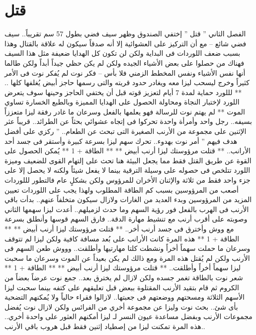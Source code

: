 \chapter{قتل}



الفصل الثاني
” قتل ”
إختفي الصندوق وظهر سيف فضي بطول 57 سم تقريباً..
سيف فضي
شائع
– مع أن التركيز على العشوائية إلا أنه صدقاً سيكون له علاقة بالقتال وهذا بسبب ضعف اللوردات فى البداية ولكن لن تكون كل الهدايا ضعيفة مثل هذا السيف فهناك من حصلوا على بعض الأشياء الجيده ولكن لم يكن حظي جيداً أبداً ولكن طالما أنها نفس الأشياء ونفس المخطط الزمني فلا بأس – فكر نوت
لم يُفكر نوت فى الأمر كثيراً وخرج ليسحب ليزا معه ويغادر حدود قريته والتى رسمها حاجز أبيض يُغلفها كلها ..
** لللورد حماية لمدة 7 أيام لتعزيز قوته قبل أن يختفي الحاجز وحينها سوف يتعرض اللورد لإختبار النجاة ومحاولة الحصول على الهدايا المميزة وبالطبع الخسارة تساوي الموت **
لم يهتم نوت للرسالة فهو يعلمها بالفعل وسرعان ما غادر رفقة ليزا متعززاً بسيفه..
رجل واحد وأمرأة واحدة تحركوا فى إتجاه عشوائي بحثاً عن الطرائد..
قريباً عثر الإثنين على مجموعة من الأرنب الصغيرة التى تبحث عن الطعام..
” ركزي على أفضل هدف فيهم ” أمر نوت بهدوء..
تحرك سهم ليزا بسرعة كبيرة وأستقر فى جسد أحد الأرانب..
** قتلت مرؤوستك ليزا أرنب أبيض **
** الطاقة + 1 **
يُمكن الحصول على القوة عن طريق القتل فقط مما يجعل البيئة هنا تحث على إلتهام القوى للضعيف وميزة اللورد تتلخص فى حصوله على وسيلة الترقية بينما لا يفعل شيئاً ولكنه لا يحصل إلا على جزء واحد فقط من ثلاثة والإثنان الأخران للمرؤوس ولكن بشكلٍ عام فالتطور لللوردات أصعب من المرؤوسين بسبب كم الطاقة المطلوب ولهذا يجب على اللوردات تعيين المزيد من المرؤوسين وبدء العديد من الغارات ولازال سيكون متخلفاً عنهم..
بدأت باقي الأرنب فى الهرب بالفعل فور رؤية السهم وما حدث لزميلهم..
أعدت ليزا سهمها الثاني وصوبته على أقرب أرنب مع تنشيط مهارة الدقة..
فارق السهم قوسها وأنطلق بسرعة مع ووش وأخترق فى جسد أرنب أخر..
** قتلت مرؤوستك ليزا أرنب أبيض **
** الطاقة + 1 **
هذه المرة كانت الأرانب على بُعد مسافة كافية ولكن ليزا لم تتوقف وسرعان ما حملت سهماً أخراً ونشطت كلتا مهارتيها وأطلقت..
وووش
طعن السهم فى الأرنب ولكن لم يُقتل هذه المرة ومع ذالك لم يكن بعيداً عن الموت وسرعان ما سحبت ليزا سهماً أخراً وأطلقت..
** قتلت مرؤوستك ليزا أرنب أبيض **
** الطاقة + 1 **
شعر نوت بالطاقة تغمر جسده ولكن لازال لم يخترق بعد..
جمع نوت عرضاً بعضاً من الكروم ثم قام بتقيد الأرنب المقتلوة ببعض قبل تعليقهم على كتفه بينما سحبت ليزا الأسهم الثلاثة ومسحتهم ووضعتهم فى جعبتها..
لازالوا فقراء حالياً ولا يُمكنهم التضحية بأى شئ..
بحث نوت وليزا عن مجموعة أخري من الفرائس ولكن لازال نوت يُفضل مجموعات الأرنب وبفضل مساعدة عيون النسر لـ ليزا أمكنهم العثور على واحدة أخري..
هذه المرة تمكنت ليزا من إصطياد إثنين فقط قبل هروب باقي الأرنب..
